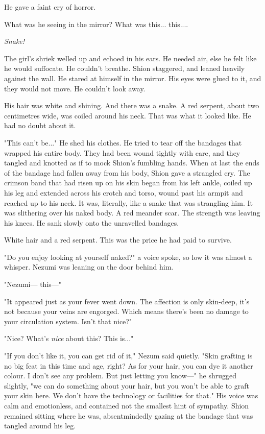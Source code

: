 He gave a faint cry of horror.

What was he seeing in the mirror? What was this... this....

\emph{Snake!}

The girl's shriek welled up and echoed in his ears. He needed air, else
he felt like he would suffocate. He couldn't breathe. Shion staggered,
and leaned heavily against the wall. He stared at himself in the mirror.
His eyes were glued to it, and they would not move. He couldn't look
away.

His hair was white and shining. And there was a snake. A red serpent,
about two centimetres wide, was coiled around his neck. That was what it
looked like. He had no doubt about it.

"This can't be..." He shed his clothes. He tried to tear off the
bandages that wrapped his entire body. They had been wound tightly with
care, and they tangled and knotted as if to mock Shion's fumbling hands.
When at last the ends of the bandage had fallen away from his body,
Shion gave a strangled cry. The crimson band that had risen up on his
skin began from his left ankle, coiled up his leg and extended across
his crotch and torso, wound past his armpit and reached up to his neck.
It was, literally, like a snake that was strangling him. It was
slithering over his naked body. A red meander scar. The strength was
leaving his knees. He sank slowly onto the unravelled bandages.

White hair and a red serpent. This was the price he had paid to survive.

"Do you enjoy looking at yourself naked?" a voice spoke, so low it was
almost a whisper. Nezumi was leaning on the door behind him.

"Nezumi--- this---"

"It appeared just as your fever went down. The affection is only
skin-deep, it's not because your veins are engorged. Which means there's
been no damage to your circulation system. Isn't that nice?"

"Nice? What's \emph{nice} about this? This is..."

"If you don't like it, you can get rid of it," Nezum said quietly. "Skin
grafting is no big feat in this time and age, right? As for your hair,
you can dye it another colour. I don't see any problem. But just letting
you know---" he shrugged slightly, "we can do something about your hair,
but you won't be able to graft your skin here. We don't have the
technology or facilities for that." His voice was calm and emotionless,
and contained not the smallest hint of sympathy. Shion remained sitting
where he was, absentmindedly gazing at the bandage that was tangled
around his leg.

